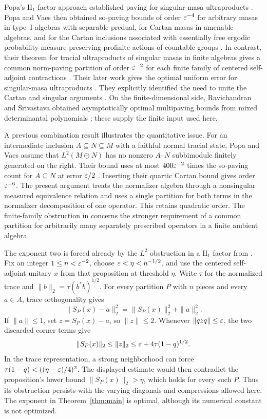 Popa's $\mathrm{II}_1$-factor approach established paving for singular-masa ultraproducts \cite{Popa14}. Popa and Vaes then obtained so-paving bounds of order $\varepsilon^{-4}$ for arbitrary masas in type~I algebras with separable predual, for Cartan masas in amenable algebras, and for the Cartan inclusions associated with essentially free ergodic probability-measure-preserving profinite actions of countable groups \cite[Proposition~3.2 and Theorem~4.1]{PV15}. In contrast, their theorem for tracial ultraproducts of singular masas in finite algebras gives a common norm-paving partition of order $\varepsilon^{-2}$ for each finite family of centered self-adjoint contractions \cite[Theorem~5.1]{PV15}. Their later work gives the optimal uniform error for singular-masa ultraproducts \cite[Theorem~4.1]{PV16}. They explicitly identified the need to unite the Cartan and singular arguments \cite[Remark~2.9(ii)]{PV15}. On the finite-dimensional side, Ravichandran and Srivastava obtained asymptotically optimal multipaving bounds from mixed determinantal polynomials \cite{RS17}; these supply the finite input used here.

A previous combination result illustrates the quantitative issue. For an intermediate inclusion $A\subseteq N\subseteq M$ with a faithful normal tracial state, Popa and Vaes assume that $L^2(M\ominus N)$ has no nonzero $A$--$N$ subbimodule finitely generated on the right. Their bound uses at most $400\varepsilon^{-2}$ times the so-paving count for $A\subseteq N$ at error $\varepsilon/2$ \cite[Remark~5.3]{PV15}. Inserting their quartic Cartan bound gives order $\varepsilon^{-6}$. The present argument treats the normalizer algebra through a nonsingular measured equivalence relation and uses a single partition for both terms in the normalizer decomposition of one operator. This retains quadratic order. The finite-family obstruction in \cite[Remark~5.2]{PV15} concerns the stronger requirement of a common partition for arbitrarily many separately prescribed operators in a finite ambient algebra.

The exponent two is forced already by the $L^2$ obstruction in a $\mathrm{II}_1$ factor from \cite[Proposition~5.4]{PV15}. Fix an integer $1\leq n<\varepsilon^{-2}$, choose $\varepsilon<\eta<n^{-1/2}$, and use the centered self-adjoint unitary $x$ from that proposition at threshold $\eta$. Write $\tau$ for the normalized trace and $\|b\|_2=\tau(b^*b)^{1/2}$. For every partition $P$ with $n$ pieces and every $a\in A$, trace orthogonality gives
\[
 \|S_P(x)-a\|_2^2=\|S_P(x)\|_2^2+\|a\|_2^2.
\]
If $\|a\|\leq1$, set $z=S_P(x)-a$, so $\|z\|\leq2$. Whenever $\|qzq\|\leq\varepsilon$, the two discarded corner terms give
\[
 \|S_P(x)\|_2\leq\|z\|_2
 \leq\varepsilon+4\tau(1-q)^{1/2}.
\]
In the trace representation, a strong neighborhood can force $\tau(1-q)<((\eta-\varepsilon)/4)^2$. The displayed estimate would then contradict the proposition's lower bound $\|S_P(x)\|_2>\eta$, which holds for every such $P$. Thus its obstruction persists with the varying diagonals and compressions allowed here. The exponent in Theorem~\ref{thm:main} is optimal, although its numerical constant is not optimized.

